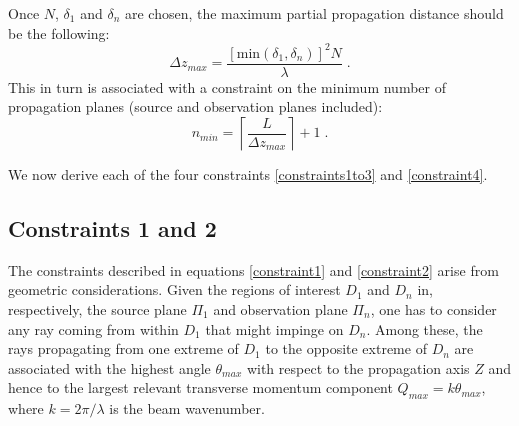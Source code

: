 \documentclass[12pt]{article}
\begin{document}
Once $N$, $\delta_1$ and $\delta_n$ are chosen, the maximum partial propagation distance should be the following:
\begin{equation}
\Delta z_{max} = \frac{ \left[ \mathrm{min}(\delta_1,\delta_n)\right]^2 N}{\lambda} \; .
\label{constraint4}
\end{equation}
This in turn is associated with a constraint on the minimum number of propagation planes (source and observation planes included):
\begin{equation}
n_{min} = \left\lceil \frac{L}{\Delta z_{max}} \right\rceil + 1 \; .
\end{equation}

We now derive each of the four constraints \eqref{constraints1to3} and \eqref{constraint4}.

\subsection{Constraints 1 and 2}
The constraints described in equations \eqref{constraint1} and \eqref{constraint2} arise from geometric considerations. Given the regions of interest $D_1$ and $D_n$ in, respectively, the source plane $\Pi_1$ and observation plane $\Pi_n$, one has to consider any ray coming from within $D_1$ that might impinge on $D_n$. Among these, the rays propagating from one extreme of $D_1$ to the opposite extreme of $D_n$ are associated with the highest angle $\theta_{max}$ with respect to the propagation axis $Z$ and hence to the largest relevant transverse momentum component $Q_{max}=k\theta_{max}$, where $k=2\pi/\lambda$ is the beam wavenumber.
\end{document}
